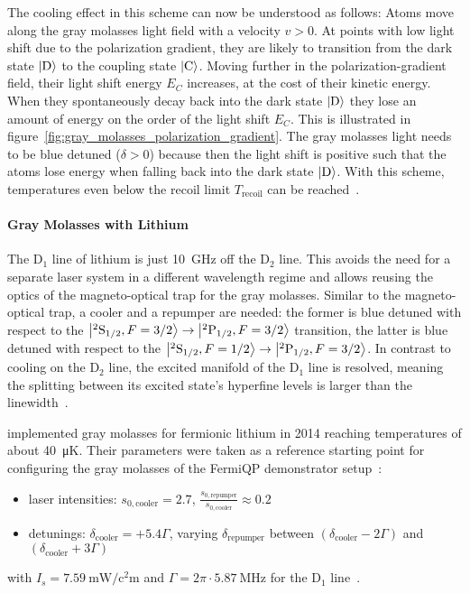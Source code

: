 The cooling effect in this scheme can now be understood as follows: Atoms move along the gray molasses light field with a velocity $v > 0$. At points with low light shift due to the polarization gradient, they are likely to transition from the dark state $\Ket{\text{D}}$ to the coupling state $\Ket{\text{C}}$. Moving further in the polarization-gradient field, their light shift energy $E_C$ increases, at the cost of their kinetic energy. When they spontaneously decay back into the dark state $\Ket{\text{D}}$ they lose an amount of energy on the order of the light shift $E_C$. This is illustrated in figure~\ref{fig:gray_molasses_polarization_gradient}. The gray molasses light needs to be blue detuned ($\delta > 0$) because then the light shift is positive such that the atoms lose energy when falling back into the dark state $\Ket{\text{D}}$. With this scheme,  temperatures even below the recoil limit $T_\text{recoil}$ can be reached~\cite{weidemuller_novel_1994,gerken_gray_2016}.


\paragraph{Gray Molasses with Lithium} The D$_1$ line of lithium is just \SI{10}{\giga\hertz} off the D$_2$ line. This avoids the need for a separate laser system in a different wavelength regime and  allows reusing the optics of the magneto-optical trap for the gray molasses. Similar to the magneto-optical trap, a cooler and a repumper are needed: the former is blue detuned with respect to the $\Ket{^2\text{S}_{1/2}, F = 3/2} \rightarrow \Ket{^2\text{P}_{1/2}, F = 3/2}$ transition, the latter is blue detuned with respect to the $\Ket{^2\text{S}_{1/2}, F = 1/2} \rightarrow \Ket{^2\text{P}_{1/2}, F = 3/2}$. In contrast to cooling on the D$_2$ line, the excited manifold of the D$_1$ line is resolved, meaning the splitting between its excited state's hyperfine levels is larger than the linewidth~\cite{gerken_gray_2016}.

\citeauthor{burchianti_efficient_2014} implemented gray molasses for fermionic lithium in 2014 reaching temperatures of about \SI[]{40}{\micro\kelvin}. Their parameters were taken as a reference starting point for configuring the gray molasses of the FermiQP demonstrator setup~\cite{burchianti_efficient_2014}:
\begin{itemize}
    \item laser intensities: $s_{0, \text{cooler}} = 2.7$, $\frac{s_{0, \text{repumper}}}{s_{0, \text{cooler}}} \approx 0.2$
    \item detunings: $\delta_\text{cooler} = +5.4 \Gamma$, varying $\delta_\text{repumper}$ between $(\delta_\text{cooler} -2 \Gamma)$ and  $(\delta_\text{cooler}+ 3\Gamma)$
\end{itemize}
with $I_s = \SI{7.59}{\milli\watt\per\square\centi\meter}$ and $\Gamma = 2\pi \cdot \SI{5.87}{\mega\hertz}$ for the D$_1$ line~\cite{gehm_properties_2003}.

